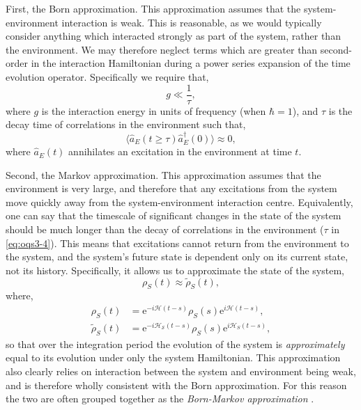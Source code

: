 First, the Born approximation. This approximation assumes that the system-environment interaction is weak. This is reasonable, as we would typically consider anything which interacted strongly as part of the system, rather than the environment. We may therefore neglect terms which are greater than second-order in the interaction Hamiltonian during a power series expansion of the time evolution operator. Specifically we require that,
\begin{equation}
	g \ll \frac{1}{\tau},
	\label{eq:oqs3-3}
\end{equation}
where \(g\) is the interaction energy in units of frequency (when \(\hbar = 1\)), and \(\tau\) is the decay time of correlations in the environment such that,
\begin{equation}
	\langle \hat{a}_{E}(t \geq \tau)\hat{a}_{E}^{\dagger}(0) \rangle \approx 0,
	\label{eq:oqs3-4}
\end{equation}
where \(\hat{a}_{E}(t)\) annihilates an excitation in the environment at time \(t\). 

Second, the Markov approximation. This approximation assumes that the environment is very large, and therefore that any excitations from the system move quickly away from the system-environment interaction centre. Equivalently, one can say that the timescale of significant changes in the state of the system should be much longer than the decay of correlations in the environment (\(\tau\) in \cref{eq:oqs3-4}). This means that excitations cannot return from the environment to the system, and the system's future state is dependent only on its current state, not its history. Specifically, it allows us to approximate the state of the system,
\begin{equation}
	\rho_{S}(t) \approx \tilde{\rho}_{S}(t),
	\label{eq:oqs3-5}
\end{equation}
where,
\begin{align}
	\rho_{S}(t) &= \mathrm{e}^{-i\mathcal{H}(t-s)}\rho_{S}(s)\mathrm{e}^{i\mathcal{H}(t-s)}, \label{eq:oqs3-6} \\
	\tilde{\rho}_{S}(t) &= \mathrm{e}^{-i\mathcal{H_{S}}(t-s)}\rho_{S}(s)\mathrm{e}^{i\mathcal{H}_{S}(t-s)}, \label{eq:oqs3-7}
\end{align}
so that over the integration period the evolution of the system is \emph{approximately} equal to its evolution under only the system Hamiltonian. This approximation also clearly relies on interaction between the system and environment being weak, and is therefore wholly consistent with the Born approximation. For this reason the two are often grouped together as the \emph{Born-Markov approximation} \cite{Hartmann_BM,BP_BMS}.

